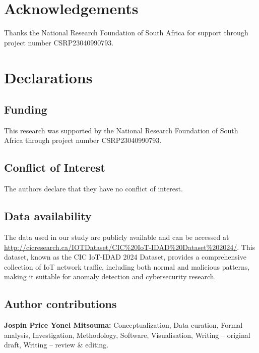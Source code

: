 \documentclass[pdflatex,sn-mathphys-num]{sn-jnl}
\begin{document}

\maketitle

\section*{Acknowledgements}
Thanks the National Research Foundation of South Africa for support through project number CSRP23040990793.

\section*{Declarations}

\subsection*{Funding}
This research was supported by the National Research Foundation of South Africa through project number CSRP23040990793.

\subsection*{Conflict of Interest}
The authors declare that they have no conflict of interest.

\subsection*{Data availability}
The data used in our study are publicly available and can be accessed at \url{http://cicresearch.ca/IOTDataset/CIC%20IoT-IDAD%20Dataset%202024/}. This dataset, known as the CIC IoT-IDAD 2024 Dataset, provides a comprehensive collection of IoT network traffic, including both normal and malicious patterns, making it suitable for anomaly detection and cybersecurity research.

\subsection*{Author contributions}
\textbf{Jospin Price Yonel Mitsouma:} Conceptualization, Data curation, Formal analysis, Investigation, Methodology, Software, Visualisation, Writing -- original draft, Writing -- review \& editing. 
\end{document}
